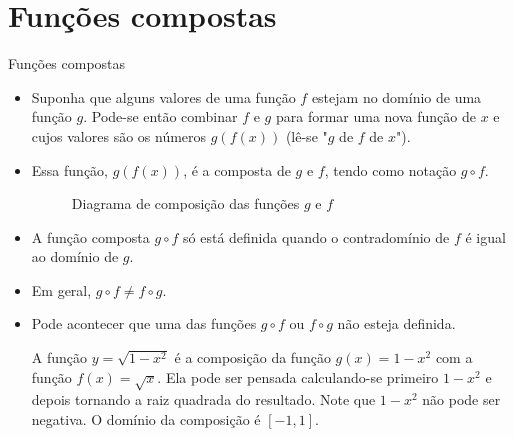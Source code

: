 \section{Funções compostas}

\begin{frame}[allowframebreaks]{Funções compostas}

\begin{itemize}
    \item Suponha que alguns valores de uma função $f$ estejam no domínio de uma função $g$. Pode-se então combinar $f$ e $g$ para formar uma nova função de $x$ e cujos valores são os números $g(f(x))$ (lê-se "$g$ de $f$ de $x$").

    \item Essa função, $g(f(x))$, é a composta de $g$ e $f$, tendo como notação $g \circ f$.

    \begin{figure}
    \caption{Diagrama de composição das funções $g$ e $f$}
    \end{figure}

    \skipframe

    \item A função composta $g \circ f$ só está definida quando o contradomínio de $f$ é igual ao domínio de $g$. 
    
    \item Em geral, $g \circ f \neq f \circ g$.

    \item Pode acontecer que uma das funções $g \circ f$ ou $f \circ g$ não esteja definida.

    \skipframe

    \begin{ex}
        A função $y = \sqrt{1 - x^2}$ é a composição da função $g(x) = 1 - x^2$ com a função $f(x) = \sqrt{x}$. Ela pode ser pensada calculando-se primeiro $1 - x^2$ e depois tornando a raiz quadrada do resultado. Note que $1 - x^2$ não pode ser negativa. O domínio da composição é $[-1, 1]$.
    \end{ex}


\end{itemize}
\end{frame}
